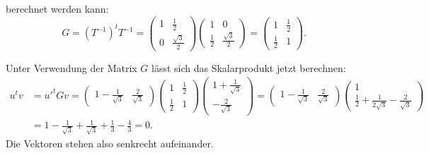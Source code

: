 \begin{loesung}
\begin{teilaufgaben}
berechnet werden kann:
\[
G
=
(T^{-1})^tT^{-1}
=
\begin{pmatrix}1&\frac12\\0&\frac{\sqrt{3}}2\end{pmatrix}
\begin{pmatrix}1&0\\\frac12&\frac{\sqrt{3}}2\end{pmatrix}
=
\begin{pmatrix} 1&\frac12\\\frac12&1 \end{pmatrix}.
\]
\item
Unter Verwendung der Matrix $G$ lässt sich das Skalarprodukt jetzt berechnen:
\begin{align*}
u^tv
&=
u'^tGv
=
\begin{pmatrix} 1-\frac1{\sqrt{3}}&\frac2{\sqrt{3}} \end{pmatrix}
\begin{pmatrix} 1&\frac12\\\frac12&1 \end{pmatrix}
\begin{pmatrix} 1+\frac1{\sqrt{3}}\\-\frac2{\sqrt{3}} \end{pmatrix}
=
\begin{pmatrix} 1-\frac1{\sqrt{3}}&\frac2{\sqrt{3}} \end{pmatrix}
\begin{pmatrix} 1\\
\frac12+\frac1{2\sqrt{3}}-\frac2{\sqrt{3}}
\end{pmatrix}
\\
&=
1-\frac1{\sqrt{3}}
+
\frac1{\sqrt{3}}+\frac13-\frac43
=
0.
\end{align*}
Die Vektoren stehen also senkrecht aufeinander.
\qedhere
\end{teilaufgaben}
\end{loesung}

